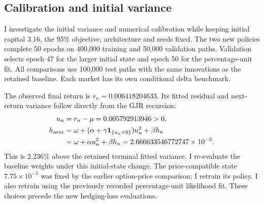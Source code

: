\documentclass[11pt,a4paper]{article}
\theoremstyle{remark}
\begin{document}
\subsection{Calibration and initial variance}
I investigate the initial variance and numerical calibration while keeping initial capital 3.16, the 95\% objective, architecture and seeds fixed. The two new policies complete 50 epochs on 400,000 training and 50,000 validation paths. Validation selects epoch 47 for the larger initial state and epoch 50 for the percentage-unit fit. All comparisons use 100,000 test paths with the same innovations as the retained baseline. Each market has its own conditional delta benchmark.

The observed final return is $r_n=0.006418204633$. Its fitted residual and next-return variance follow directly from the GJR recursion:
\begin{align}
 u_n&=r_n-\mu=0.005792913946>0,\nonumber\\
 h_{\rm next}&=\omega+(\alpha+\gamma\mathbf1_{\{u_n<0\}})u_n^2+\beta h_n\nonumber\\
 &=\omega+\alpha u_n^2+\beta h_n
 =2.666633546772747\times10^{-5}.
\end{align}
This is 2.236\% above the retained terminal fitted variance. I re-evaluate the baseline weights under this initial-state change. The price-compatible state $7.75\times10^{-5}$ was fixed by the earlier option-price comparison; I retrain its policy. I also retrain using the previously recorded percentage-unit likelihood fit. These choices precede the new hedging-loss evaluations.
\end{document}
